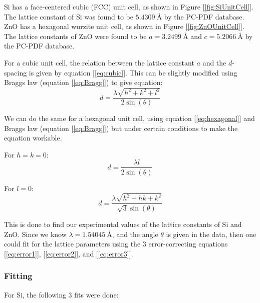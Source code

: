 \documentclass{article}
\begin{document}
Si has a face-centered cubic (FCC) unit cell, as shown in Figure [\ref{fig:SiUnitCell}]. The lattice constant of Si was found to be $ \SI{5.4309}{\angstrom}$ by the PC-PDF database.
ZnO has a hexagonal wurzite unit cell, as shown in Figure [\ref{fig:ZnOUnitCell}]. The lattice constants of ZnO were found to be $a = \SI{3.2499}{\angstrom}$ and $c =  \SI{5.2066}{\angstrom}$ by the PC-PDF database.

For a cubic unit cell, the relation between the lattice constant $a$ and the $d$-spacing is given by equation [\ref{eq:cubic}]. This can be slightly modified using Braggs law (equation [\ref{eq:Bragg}]) to give equation:
\begin{equation}
	\label{eq:cubicmodified}
	d = \frac{\lambda \sqrt{h^2 + k^2 + l^2}}{2\sin(\theta)}
\end{equation}

We can do the same for a hexagonal unit cell, using equation [\ref{eq:hexagonal}] and Braggs law (equation [\ref{eq:Bragg}]) but under certain conditions to make the equation workable.

For $h=k=0$:
\begin{equation}
	\label{eq:hexmodified}
	d = \frac{\lambda l}{2\sin(\theta)}
\end{equation}

For $l=0$:
\begin{equation}
	\label{eq:hexmodified2}
	d = \frac{\lambda \sqrt{h^2 + hk + k^2}}{\sqrt{3}\sin(\theta)}
\end{equation}

This is done to find our experimental values of the lattice constants of Si and ZnO. Since we know $\lambda = \SI{1.54045}{\angstrom}$, and the angle $\theta$ is given in the data, then one could fit for the lattice parameters using 
the 3 error-correcting equations [\ref{eq:error1}], [\ref{eq:error2}], and [\ref{eq:error3}].

\pagebreak{}

\subsubsection{Fitting}

	For Si, the following 3 fits were done:
\end{document}
